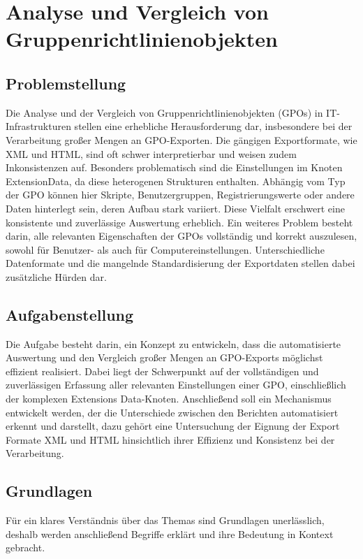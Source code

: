 \section{Analyse und Vergleich von Gruppenrichtlinienobjekten }
\subsection{Problemstellung}
    Die Analyse und der Vergleich von Gruppenrichtlinienobjekten (GPOs) in IT-Infrastrukturen stellen eine erhebliche Herausforderung dar, insbesondere bei der Verarbeitung großer Mengen an GPO-Exporten. Die gängigen Exportformate, wie XML und HTML, sind oft schwer interpretierbar und weisen zudem Inkonsistenzen auf. Besonders problematisch sind die Einstellungen im Knoten ExtensionData, da diese heterogenen Strukturen enthalten. Abhängig vom Typ der GPO können hier Skripte, Benutzergruppen, Registrierungswerte oder andere Daten hinterlegt sein, deren Aufbau stark variiert. Diese Vielfalt erschwert eine konsistente und zuverlässige Auswertung erheblich.\newline
    Ein weiteres Problem besteht darin, alle relevanten Eigenschaften der GPOs vollständig und korrekt auszulesen, sowohl für Benutzer- als auch für Computereinstellungen. Unterschiedliche Datenformate und die mangelnde Standardisierung der Exportdaten stellen dabei zusätzliche Hürden dar. 
\subsection{Aufgabenstellung}
    Die Aufgabe besteht darin, ein Konzept zu entwickeln, dass die automatisierte Auswertung und den Vergleich großer Mengen an GPO-Exports möglichst effizient realisiert. Dabei liegt der Schwerpunkt auf der vollständigen und zuverlässigen Erfassung aller relevanten Einstellungen einer GPO, einschließlich der komplexen Extensions Data-Knoten.\newline
    Anschließend soll ein Mechanismus entwickelt werden, der die Unterschiede zwischen den Berichten automatisiert erkennt und darstellt, dazu gehört eine Untersuchung der Eignung der Export Formate XML und HTML hinsichtlich ihrer Effizienz und Konsistenz bei der Verarbeitung. 
\subsection{Grundlagen}
    Für ein klares Verständnis über das Themas sind Grundlagen unerlässlich, deshalb werden anschließend Begriffe erklärt und ihre Bedeutung in Kontext gebracht.
